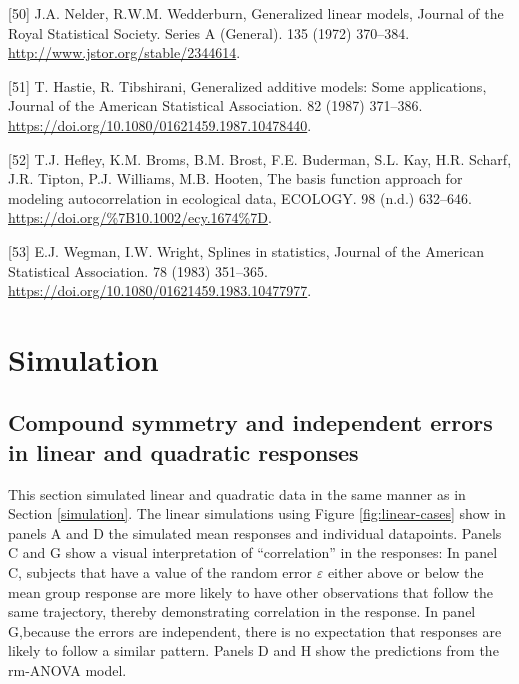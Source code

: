 \documentclass[
]{article}
\begin{document}
\leavevmode\hypertarget{ref-nelder1972}{}%
{[}50{]} J.A. Nelder, R.W.M. Wedderburn, Generalized linear models, Journal of the Royal Statistical Society. Series A (General). 135 (1972) 370--384. \url{http://www.jstor.org/stable/2344614}.

\leavevmode\hypertarget{ref-hastie1987}{}%
{[}51{]} T. Hastie, R. Tibshirani, Generalized additive models: Some applications, Journal of the American Statistical Association. 82 (1987) 371--386. \url{https://doi.org/10.1080/01621459.1987.10478440}.

\leavevmode\hypertarget{ref-hefley2017}{}%
{[}52{]} T.J. Hefley, K.M. Broms, B.M. Brost, F.E. Buderman, S.L. Kay, H.R. Scharf, J.R. Tipton, P.J. Williams, M.B. Hooten, The basis function approach for modeling autocorrelation in ecological data, ECOLOGY. 98 (n.d.) 632--646. \url{https://doi.org/\%7B10.1002/ecy.1674\%7D}.

\leavevmode\hypertarget{ref-wegman1983}{}%
{[}53{]} E.J. Wegman, I.W. Wright, Splines in statistics, Journal of the American Statistical Association. 78 (1983) 351--365. \url{https://doi.org/10.1080/01621459.1983.10477977}.

\newpage

\hypertarget{appendix-appendix}{%
\appendix}


\hypertarget{simulation-1}{%
\section{Simulation}\label{simulation-1}}

\hypertarget{compound-symmetry-and-independent-errors-in-linear-and-quadratic-responses}{%
\subsection{Compound symmetry and independent errors in linear and quadratic responses}\label{compound-symmetry-and-independent-errors-in-linear-and-quadratic-responses}}

This section simulated linear and quadratic data in the same manner as in Section \ref{simulation}. The linear simulations using Figure \ref{fig:linear-cases} show in panels A and D the simulated mean responses and individual datapoints. Panels C and G show a visual interpretation of ``correlation'' in the responses: In panel C, subjects that have a value of the random error \(\varepsilon\) either above or below the mean group response are more likely to have other observations that follow the same trajectory, thereby demonstrating correlation in the response. In panel G,because the errors are independent, there is no expectation that responses are likely to follow a similar pattern. Panels D and H show the predictions from the rm-ANOVA model.
\end{document}
